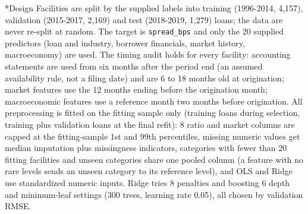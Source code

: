 \documentclass[9pt,letterpaper]{extarticle}
\makeatletter
\renewcommand\section{\@startsection{section}{1}{\z@}{6pt plus 2pt minus 1pt}{3pt plus 1pt}%
  {\normalfont\large\bfseries\color{navy}}}
\makeatother
\begin{document}
\section*{Design}
Facilities are split by the supplied labels into training (1996-2014, 4,157), validation (2015-2017, 2,169) and test (2018-2019, 1,279) loans; the data are never re-split at random. The target is \texttt{spread\_bps} and only the 20 supplied predictors (loan and industry, borrower financials, market history, macroeconomy) are used. The timing audit holds for every facility: accounting statements are used from six months after the period end (an assumed availability rule, not a filing date) and are 6 to 18 months old at origination; market features use the 12 months ending before the origination month; macroeconomic features use a reference month two months before origination. All preprocessing is fitted on the fitting sample only (training loans during selection, training plus validation loans at the final refit): 8 ratio and market columns are capped at the fitting-sample 1st and 99th percentiles, missing numeric values get median imputation plus missingness indicators, categories with fewer than 20 fitting facilities and unseen categories share one pooled column (a feature with no rare levels sends an unseen category to its reference level), and OLS and Ridge use standardized numeric inputs. Ridge tries 8 penalties and boosting 6 depth and minimum-leaf settings (300 trees, learning rate 0.05), all chosen by validation RMSE.

\end{document}
